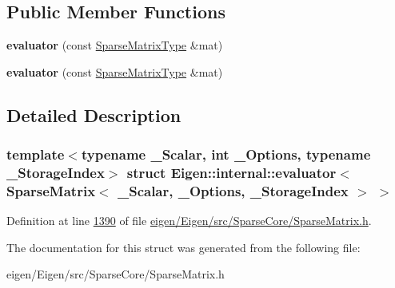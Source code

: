 \subsection*{Public Member Functions}
\begin{DoxyCompactItemize}
\item 
\mbox{\label{struct_eigen_1_1internal_1_1evaluator_3_01_sparse_matrix_3_01___scalar_00_01___options_00_01___storage_index_01_4_01_4_ad5881173fa915ccbc516df44af12d32b}} 
{\bfseries evaluator} (const \hyperlink{group___sparse_core___module_class_eigen_1_1_sparse_matrix}{Sparse\+Matrix\+Type} \&mat)
\item 
\mbox{\label{struct_eigen_1_1internal_1_1evaluator_3_01_sparse_matrix_3_01___scalar_00_01___options_00_01___storage_index_01_4_01_4_ad5881173fa915ccbc516df44af12d32b}} 
{\bfseries evaluator} (const \hyperlink{group___sparse_core___module_class_eigen_1_1_sparse_matrix}{Sparse\+Matrix\+Type} \&mat)
\end{DoxyCompactItemize}


\subsection{Detailed Description}
\subsubsection*{template$<$typename \+\_\+\+Scalar, int \+\_\+\+Options, typename \+\_\+\+Storage\+Index$>$\newline
struct Eigen\+::internal\+::evaluator$<$ Sparse\+Matrix$<$ \+\_\+\+Scalar, \+\_\+\+Options, \+\_\+\+Storage\+Index $>$ $>$}



Definition at line \hyperlink{eigen_2_eigen_2src_2_sparse_core_2_sparse_matrix_8h_source_l01390}{1390} of file \hyperlink{eigen_2_eigen_2src_2_sparse_core_2_sparse_matrix_8h_source}{eigen/\+Eigen/src/\+Sparse\+Core/\+Sparse\+Matrix.\+h}.



The documentation for this struct was generated from the following file\+:\begin{DoxyCompactItemize}
\item 
eigen/\+Eigen/src/\+Sparse\+Core/\+Sparse\+Matrix.\+h\end{DoxyCompactItemize}

